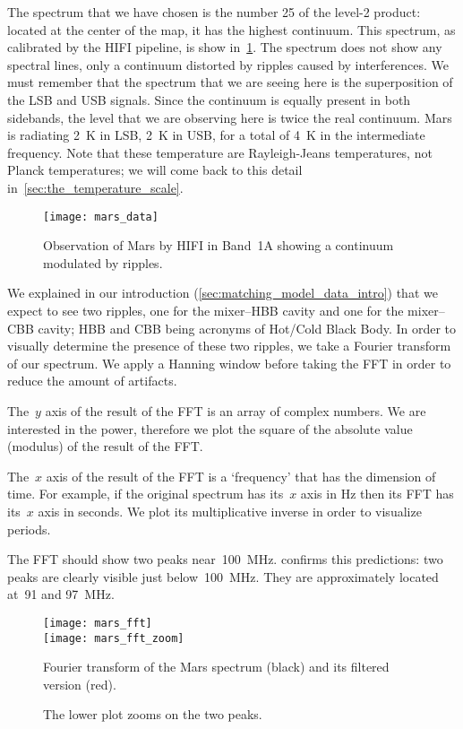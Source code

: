The spectrum that we have chosen is the number 25 of the level-2 product: located at the center of the map, it has the highest continuum.
This spectrum, as calibrated by the HIFI pipeline, is show in~\cref{fig:mars_data}.
The spectrum does not show any spectral lines, only a continuum distorted by ripples caused by interferences.
We must remember that the spectrum that we are seeing here is the superposition of the LSB and USB signals.
Since the continuum is equally present in both sidebands, the level that we are observing here is twice the real continuum.
Mars is radiating \SI{2}{\kelvin} in LSB, \SI{2}{\kelvin} in USB, for a total of \SI{4}{\kelvin} in the intermediate frequency.
Note that these temperature are Rayleigh-Jeans temperatures, not Planck temperatures; we will come back to this detail in~\cref{sec:the_temperature_scale}.
\begin{figure}
    \centering
    \texttt{[image: mars\_data]}
    \caption{Observation of Mars by HIFI in Band~1A showing a continuum modulated by ripples.}
    \label{fig:mars_data}
\end{figure}

We explained in our introduction (\cref{sec:matching_model_data_intro}) that we expect to see two ripples, one for the mixer--HBB cavity and one for the mixer--CBB cavity;
HBB and CBB being acronyms of Hot/Cold Black Body.
In order to visually determine the presence of these two ripples, we take a Fourier transform of our spectrum.
We apply a Hanning window before taking the FFT in order to reduce the amount of artifacts.

The~$y$ axis of the result of the FFT is an array of complex numbers.
We are interested in the power, therefore we plot the square of the absolute value (modulus) of the result of the FFT.

The~$x$ axis of the result of the FFT is a `frequency' that has the dimension of time.
For example, if the original spectrum has its~$x$ axis in \si{\hertz} then its FFT has its~$x$ axis in seconds.
We plot its multiplicative inverse in order to visualize periods.

The FFT should show two peaks near~\SI{100}{\mega\hertz}.
 confirms this predictions:
two peaks are clearly visible just below~\SI{100}{\mega\hertz}.
They are approximately located at~\num{91} and \SI{97}{\mega\hertz}.
\begin{figure}[hbtp]
    \centering
    \texttt{[image: mars\_fft]}\\
    \texttt{[image: mars\_fft\_zoom]}
    \caption{Fourier transform of the Mars spectrum (black) and its filtered version (red).}
    \caption*{The lower plot zooms on the two peaks.}
    \label{fig:mars_fft}
\end{figure}

